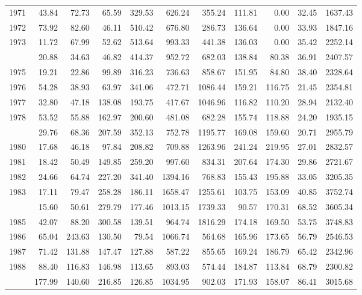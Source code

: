 \begin{longtable}[t]{rrrrrrrrrrr}
1971 & 43.84 & 72.73 & 65.59 & 329.53 & 626.24 & 355.24 & 111.81 & 0.00 & 32.45 & 1637.43\\
1972 & 73.92 & 82.60 & 46.11 & 510.42 & 676.80 & 286.73 & 136.64 & 0.00 & 33.93 & 1847.16\\
1973 & 11.72 & 67.99 & 52.62 & 513.64 & 993.33 & 441.38 & 136.03 & 0.00 & 35.42 & 2252.14\\
\addlinespace
1974 & 20.88 & 34.63 & 46.82 & 414.37 & 952.72 & 682.03 & 138.84 & 80.38 & 36.91 & 2407.57\\
1975 & 19.21 & 22.86 & 99.89 & 316.23 & 736.63 & 858.67 & 151.95 & 84.80 & 38.40 & 2328.64\\
1976 & 54.28 & 38.93 & 63.97 & 341.06 & 472.71 & 1086.44 & 159.21 & 116.75 & 21.45 & 2354.81\\
1977 & 32.80 & 47.18 & 138.08 & 193.75 & 417.67 & 1046.96 & 116.82 & 110.20 & 28.94 & 2132.40\\
1978 & 53.52 & 55.88 & 162.97 & 200.60 & 481.08 & 682.28 & 155.74 & 118.88 & 24.20 & 1935.15\\
\addlinespace
1979 & 29.76 & 68.36 & 207.59 & 352.13 & 752.78 & 1195.77 & 169.08 & 159.60 & 20.71 & 2955.79\\
1980 & 17.68 & 46.18 & 97.84 & 208.82 & 709.88 & 1263.96 & 241.24 & 219.95 & 27.01 & 2832.57\\
1981 & 18.42 & 50.49 & 149.85 & 259.20 & 997.60 & 834.31 & 207.64 & 174.30 & 29.86 & 2721.67\\
1982 & 24.66 & 64.74 & 227.20 & 341.40 & 1394.16 & 768.83 & 155.43 & 195.88 & 33.05 & 3205.35\\
1983 & 17.11 & 79.47 & 258.28 & 186.11 & 1658.47 & 1255.61 & 103.75 & 153.09 & 40.85 & 3752.74\\
\addlinespace
1984 & 15.60 & 50.61 & 279.79 & 177.46 & 1013.15 & 1739.33 & 90.57 & 170.31 & 68.52 & 3605.34\\
1985 & 42.07 & 88.20 & 300.58 & 139.51 & 964.74 & 1816.29 & 174.18 & 169.50 & 53.75 & 3748.83\\
1986 & 65.04 & 243.63 & 130.50 & 79.54 & 1066.74 & 564.68 & 165.96 & 173.65 & 56.79 & 2546.53\\
1987 & 71.42 & 131.88 & 147.47 & 127.88 & 587.22 & 855.65 & 169.24 & 186.79 & 65.42 & 2342.96\\
1988 & 88.40 & 116.83 & 146.98 & 113.65 & 893.03 & 574.44 & 184.87 & 113.84 & 68.79 & 2300.82\\
\addlinespace
1989 & 177.99 & 140.60 & 216.85 & 126.85 & 1034.95 & 902.03 & 171.93 & 158.07 & 86.41 & 3015.68\\

\end{longtable}
